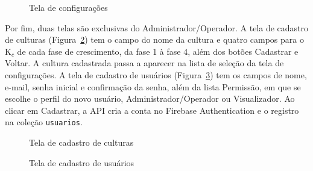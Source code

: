 \begin{figure}[!htbp]
  \centering
  \caption{Tela de configurações}
  \label{fig:tela-configuracoes}
\end{figure}

Por fim, duas telas são exclusivas do Administrador/Operador. A tela de cadastro de culturas (Figura~\ref{fig:tela-cultura}) tem o campo do nome da cultura e quatro campos para o K$_c$ de cada fase de crescimento, da fase 1 à fase 4, além dos botões Cadastrar e Voltar. A cultura cadastrada passa a aparecer na lista de seleção da tela de configurações. A tela de cadastro de usuários (Figura~\ref{fig:tela-cadastro}) tem os campos de nome, e-mail, senha inicial e confirmação da senha, além da lista Permissão, em que se escolhe o perfil do novo usuário, Administrador/Operador ou Visualizador. Ao clicar em Cadastrar, a API cria a conta no Firebase Authentication e o registro na coleção \texttt{usuarios}.

\begin{figure}[!htbp]
  \centering
  \caption{Tela de cadastro de culturas}
  \label{fig:tela-cultura}
\end{figure}

\begin{figure}[!htbp]
  \centering
  \caption{Tela de cadastro de usuários}
  \label{fig:tela-cadastro}
\end{figure}
